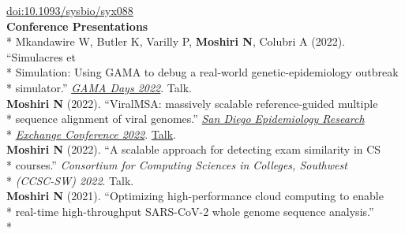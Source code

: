 \documentclass[margin,line]{res}
\begin{document}
\begin{resume}
\hspace*{8mm} \href{https://doi.org/10.1093/sysbio/syx088}{doi:10.1093/sysbio/syx088}
~\\
\textbf{Conference Presentations}\vspace{2mm}\\*
\hspace*{4mm} Mkandawire W, Butler K, Varilly P, \textbf{Moshiri N}, Colubri A (2022). ``Simulacres et\\*
\hspace*{9mm} Simulation: Using GAMA to debug a real-world genetic-epidemiology outbreak\\*\vspace{2mm}
\hspace*{8mm} simulator.'' \href{https://gama-platform.org/Gama-Days-2022/}{\textit{GAMA Days 2022}}. Talk.\\
\hspace*{4mm} \textbf{Moshiri N} (2022). ``ViralMSA: massively scalable reference-guided multiple\\*
\hspace*{9mm} sequence alignment of viral genomes.'' \href{https://publichealth.sdsu.edu/epiexchange}{\textit{San Diego Epidemiology Research}}\\*\vspace{2mm}
\hspace*{8mm} \href{https://publichealth.sdsu.edu/epiexchange}{\textit{Exchange Conference 2022}}. \href{https://docs.google.com/document/d/e/2PACX-1vTufgGn-94tzBuzs1MXideQPxZApXW0EvSHIyfKQX8xdXPvwVo1H3C4WbWSgmp67BbERnjzc_tkYqdm/pub}{Talk}.\\
\hspace*{4mm} \textbf{Moshiri N} (2022). ``A scalable approach for detecting exam similarity in CS\\*
\hspace*{9mm} courses.'' \textit{Consortium for Computing Sciences in Colleges, Southwest}\\*\vspace{2mm}
\hspace*{8mm} \textit{(CCSC-SW) 2022}. Talk.\\
\hspace*{4mm} \textbf{Moshiri N} (2021). ``Optimizing high-performance cloud computing to enable\\*
\hspace*{9mm} real-time high-throughput SARS-CoV-2 whole genome sequence analysis.''\\*\vspace{2mm}

\end{resume}
\end{document}

